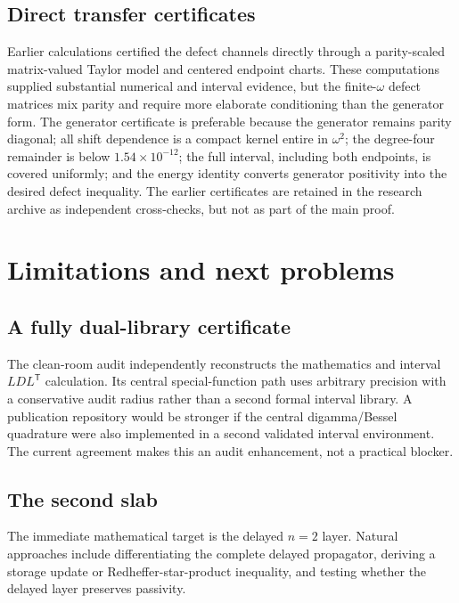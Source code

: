 \documentclass[11pt,a4paper]{article}
\theoremstyle{plain}
\theoremstyle{definition}
\numberwithin{equation}{section}
\begin{document}
\subsection{Direct transfer certificates}

Earlier calculations certified the defect channels directly through a
parity-scaled matrix-valued Taylor model and centered endpoint charts. These
computations supplied substantial numerical and interval evidence, but the
finite-$\omega$ defect matrices mix parity and require more elaborate
conditioning than the generator form. The generator certificate is preferable
because the generator remains parity diagonal; all shift dependence is a
compact kernel entire in $\omega^2$; the degree-four remainder is below
$1.54\times10^{-12}$; the full interval, including both endpoints, is covered
uniformly; and the energy identity converts generator positivity into the
desired defect inequality. The earlier certificates are retained in the
research archive as independent cross-checks, but not as part of the main
proof.

\section{Limitations and next problems}

\subsection{A fully dual-library certificate}

The clean-room audit independently reconstructs the mathematics and interval
$LDL^{\mathsf T}$ calculation. Its central special-function path uses
arbitrary precision with a conservative audit radius rather than a second
formal interval library. A publication repository would be stronger if the
central digamma/Bessel quadrature were also implemented in a second validated
interval environment. The current agreement makes this an audit enhancement,
not a practical blocker.

\subsection{The second slab}

The immediate mathematical target is the delayed $n=2$ layer. Natural
approaches include differentiating the complete delayed propagator, deriving a
storage update or Redheffer-star-product inequality, and testing whether the
delayed layer preserves passivity.
\end{document}
